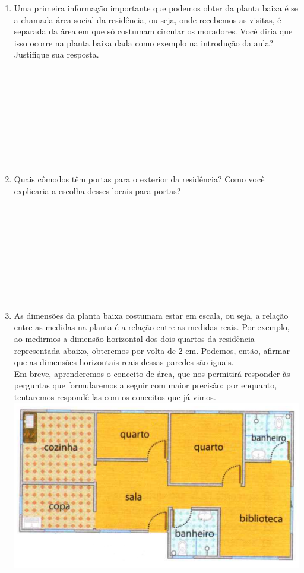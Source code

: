 \documentclass[a4paper,14pt]{article}
\begin{document}
	\begin{multicols}{2}
			\begin{enumerate} 
			\item Uma primeira informação importante que podemos obter da planta baixa é se a chamada área social da residência, ou seja, onde recebemos as visitas, é separada da área em que só costumam circular os moradores. Você diria que isso ocorre na planta baixa dada como exemplo na introdução da aula? \\ Justifique sua resposta. \\\\\\\\\\\\\\\\\\\\
			\item Quais cômodos têm portas para o exterior da residência? Como você explicaria a escolha desses locais para portas? \\\\\\\\\\\\\\\\\\\\
			\item As dimensões da planta baixa costumam estar em escala, ou seja, a relação entre as medidas na planta é a relação entre as medidas reais. Por exemplo, ao medirmos a dimensão horizontal dos dois quartos da residência representada abaixo, obteremos por volta de 2 cm. Podemos, então, afirmar que as dimensões horizontais reais dessas paredes são iguais. \\
			Em breve, aprenderemos o conceito de área, que nos permitirá responder às perguntas que formularemos a seguir com maior precisão: por enquanto, tentaremos respondê-las com os conceitos que já vimos.\\
			\includegraphics[width=1\linewidth]{6FMA30_imagens/imagem2} 

\end{enumerate}
\end{multicols}
\end{document}
